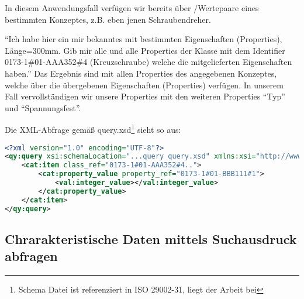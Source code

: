 In diesem Anwendungsfall verfügen wir bereits über /Wertepaare eines bestimmten Konzeptes, z.B. eben jenen Schraubendreher.

\enquote{Ich habe hier ein mir bekanntes  mit bestimmten Eigenschaften (Properties), Länge=300mm. Gib mir alle  und alle Properties der Klasse mit dem Identifier 0173-1\#01-AAA352\#4 (Kreuzschraube) welche die mitgelieferten Eigenschaften haben.}
Das Ergebnis sind  mit allen Properties des angegebenen Konzeptes, welche über die übergebenen Eigenschaften (Properties) verfügen. In unserem Fall vervollständigen wir unsere Properties mit den weiteren Properties \enquote{Typ} und \enquote{Spannungsfest}.

Die XML-Abfrage gemäß query.xsd\footnote{Schema Datei ist referenziert in ISO 29002-31, liegt der Arbeit bei} sieht so aus:

\begin{lstlisting}[caption=Query Beispiel - Daten validieren, language=XML, label=UseCaseDatenvalidieren]
<?xml version="1.0" encoding="UTF-8"?>
<qy:query xsi:schemaLocation="...query query.xsd" xmlns:xsi="http://www.w3.org/2001/XMLSchema-instance" xmlns:cat="...catalogue" xmlns:val="...value" xmlns:qy="...query" xmlns:bas="...basic">
	<cat:item class_ref="0173-1#01-AAA352#4..">
		<cat:property_value property_ref="0173-1#01-BBB111#1">
			<val:integer_value></val:integer_value>
		</cat:property_value>
	</cat:item>
</qy:query>
\end{lstlisting}

\subsection{Chrarakteristische Daten mittels Suchausdruck abfragen }

